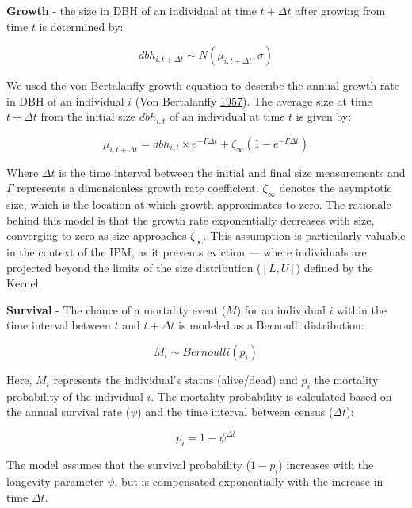 \documentclass[12pt]{article}
\begin{document}
\textbf{Growth} - the size in DBH of an individual at time
\(t + \Delta t\) after growing from time \(t\) is determined by:

\begin{equation}
  dbh_{i,t + \Delta t} \sim N(\mu_{i, t+\Delta t}, \sigma)
\label{eq:VBlik}\end{equation}

We used the von Bertalanffy growth equation to describe the annual
growth rate in DBH of an individual \(i\) (Von Bertalanffy
\protect\hyperlink{ref-von1957quantitative}{1957}). The average size at
time \(t+\Delta t\) from the initial size \(dbh_{i, t}\) of an
individual at time \(t\) is given by:

\begin{equation}
  \mu_{i, t+\Delta t} = dbh_{i,t}  \times e^{-\Gamma \Delta t} + \zeta_{\infty} (1- e^{-\Gamma \Delta t})
\label{eq:VBmodel}\end{equation}

Where \(\Delta t\) is the time interval between the initial and final
size measurements and \(\Gamma\) represents a dimensionless growth rate
coefficient. \(\zeta_{\infty}\) denotes the asymptotic size, which is
the location at which growth approximates to zero. The rationale behind
this model is that the growth rate exponentially decreases with size,
converging to zero as size approaches \(\zeta_{\infty}\). This
assumption is particularly valuable in the context of the IPM, as it
prevents eviction --- where individuals are projected beyond the limits
of the size distribution (\([L, U]\)) defined by the Kernel.

\textbf{Survival} - The chance of a mortality event (\(M\)) for an
individual \(i\) within the time interval between \(t\) and
\(t+\Delta t\) is modeled as a Bernoulli distribution:

\begin{equation}
M_i \sim Bernoulli(p_i)
\label{eq:survL}\end{equation}

Here, \(M_i\) represents the individual's status (alive/dead) and
\(p_i\) the mortality probability of the individual \(i\). The mortality
probability is calculated based on the annual survival rate (\(\psi\))
and the time interval between census (\(\Delta t\)):

\begin{equation}
p_i = 1 - \psi^{\Delta t}
\label{eq:survP}\end{equation}

The model assumes that the survival probability (\(1 - p_i\)) increases
with the longevity parameter \(\psi\), but is compensated exponentially
with the increase in time \(\Delta t\).
\end{document}
